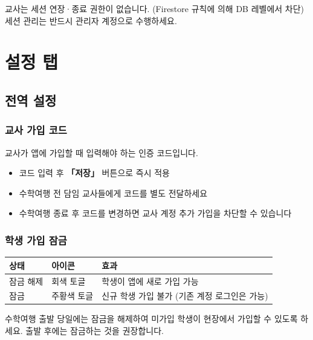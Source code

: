 \documentclass[a4paper,11pt]{article}
\begin{document}
\begin{tcolorbox}[warnbox]
교사는 세션 연장·종료 권한이 없습니다. (Firestore 규칙에 의해 DB 레벨에서 차단)\\
세션 관리는 반드시 관리자 계정으로 수행하세요.
\end{tcolorbox}

\section{설정 탭}

\subsection{전역 설정}

\subsubsection{교사 가입 코드}

교사가 앱에 가입할 때 입력해야 하는 인증 코드입니다.

\begin{itemize}
  \item 코드 입력 후 \textbf{「저장」} 버튼으로 즉시 적용
  \item 수학여행 전 담임 교사들에게 코드를 별도 전달하세요
  \item 수학여행 종료 후 코드를 변경하면 교사 계정 추가 가입을 차단할 수 있습니다
\end{itemize}

\subsubsection{학생 가입 잠금}

\begin{center}
\begin{tabular}{@{}lll@{}}
  \toprule
  \textbf{상태} & \textbf{아이콘} & \textbf{효과} \\
  \midrule
  잠금 해제 & 회색 토글 & 학생이 앱에 새로 가입 가능 \\
  잠금 & 주황색 토글 & 신규 학생 가입 불가 (기존 계정 로그인은 가능) \\
  \bottomrule
\end{tabular}
\end{center}

\begin{tcolorbox}[tipbox]
수학여행 출발 당일에는 잠금을 해제하여 미가입 학생이 현장에서 가입할 수 있도록 하세요.
출발 후에는 잠금하는 것을 권장합니다.
\end{tcolorbox}
\end{document}
